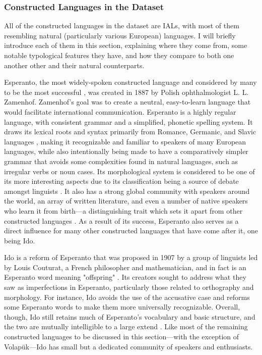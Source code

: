 \documentclass[12pt,a4paper]{article}
\numberwithin{figure}{section}
\numberwithin{table}{section}
\numberwithin{definition}{section}
\begin{document}
\subsubsection{Constructed Languages in the Dataset}
\label{ssec:constructedlanguagesinthedataset}


All of the constructed languages in the dataset are IALs, with most of them resembling natural (particularly various European) languages. I will briefly introduce each of them in this section, explaining where they come from, some notable typological features they have, and how they compare to both one another other and their natural counterparts.

Esperanto, the most widely-spoken constructed language and considered by many to be the most successful \parencite{Gobbo2008article}, was created in 1887 by Polish ophthalmologist L. L. Zamenhof. Zamenhof’s goal was to create a neutral, easy-to-learn language that would facilitate international communication. Esperanto is a highly regular language, with consistent grammar and a simplified, phonetic spelling system. It draws its lexical roots and syntax primarily from Romance, Germanic, and Slavic languages \parencite{Gobbo2008article,Gobbo2011article}, making it recognizable and familiar to speakers of many European languages, while also intentionally being made to have a comparatively simpler grammar that avoids some complexities found in natural languages, such as irregular verbs or noun cases. Its morphological system is considered to be one of its more interesting aspects due to its classification being a source of debate amongst linguists \parencite{Reagan2019book}. It also has a strong global community with speakers around the world, an array of written literature, and even a number of native speakers who learn it from birth---a distinguishing trait which sets it apart from other constructed languages \parencite{goodall2022article}. As a result of its success, Esperanto also serves as a direct influence for many other constructed languages that have come after it, one being Ido. 

Ido is a reform of Esperanto that was proposed in 1907 by a group of linguists led by Louis Couturat, a French philosopher and mathematician, and in fact is an Esperanto word meaning "offspring" \parencite{Schubert2001book}. Its creators sought to address what they saw as imperfections in Esperanto, particularly those related to orthography and morphology. For instance, Ido avoids the use of the accusative case and reforms some Esperanto words to make them more universally recognizable. Overall, though, Ido still retains much of Esperanto’s vocabulary and basic structure, and the two are mutually intelligible to a large extend \parencite{goodall2022article,Schubert2001book}. Like most of the remaining constructed languages to be discussed in this section---with the exception of Volapük---Ido has small but a dedicated community of speakers and enthusiasts.
\end{document}
